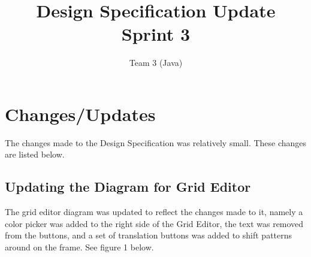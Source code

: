 \documentclass[12pt]{article}
\begin{document}
	
	\setlength{\parindent}{15pt}
	\newcommand{\forceindent}{\leavevmode{\parindent=2em\indent}}
	
	
	\title{ Design Specification Update \\ Sprint 3}
	\author{Team 3 (Java)}
	\date{}
	\maketitle
	
	\tableofcontents
	\setcounter{tocdepth}{3}		%
	\newpage
	
	\appendix
	
		\section{Changes/Updates}
		\forceindent The changes made to the Design Specification was relatively small. These changes are listed below.
		
			\subsection {Updating the Diagram for Grid Editor}
			\forceindent The grid editor diagram was updated to reflect the changes made to it, namely a color picker was added to the right side of the Grid Editor, the text was removed from the buttons, and a set of translation buttons was added to shift patterns around on the frame. See figure 1 below.
      
\end{document}
